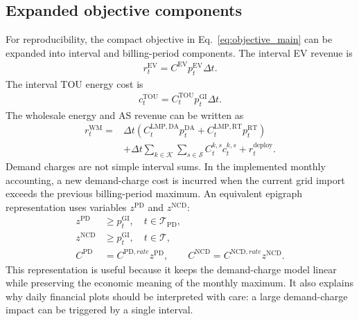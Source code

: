 \documentclass[final,5p,times]{elsarticle}
\newcommand{\DeltaT}{\Delta t}
\newcommand{\EV}{\mathrm{EV}}
\newcommand{\DA}{\mathrm{DA}}
\newcommand{\RT}{\mathrm{RT}}
\newcommand{\GI}{\mathrm{GI}}
\newcommand{\TOU}{\mathrm{TOU}}
\newcommand{\PD}{\mathrm{PD}}
\newcommand{\NCD}{\mathrm{NCD}}
\newcommand{\WM}{\mathrm{WM}}
\newcommand{\calT}{\mathcal{T}}
\newcommand{\calK}{\mathcal{K}}
\newcommand{\calS}{\mathcal{S}}
\begin{document}
\subsection{Expanded objective components}
For reproducibility, the compact objective in Eq.~\eqref{eq:objective_main} can be expanded into interval and billing-period components. The interval EV revenue is
\begin{align}
r_t^{\EV}=C^{\EV}p_t^{\EV}\DeltaT.
\label{eq:interval_ev_rev}
\end{align}
The interval TOU energy cost is
\begin{align}
c_t^{\TOU}=C_t^{\TOU}p_t^{\GI}\DeltaT.
\label{eq:interval_tou}
\end{align}
The wholesale energy and AS revenue can be written as
\begin{align}
r_t^{\WM}=&\DeltaT\left(C_t^{\mathrm{LMP},\DA}p_t^{\DA}+C_t^{\mathrm{LMP},\RT}p_t^{\RT}\right)\nonumber\\
&+\DeltaT\sum_{k\in\calK}\sum_{s\in\calS}C_t^{k,s}c_t^{k,s}+r_t^{\mathrm{deploy}}.
\label{eq:interval_wm_rev}
\end{align}
Demand charges are not simple interval sums. In the implemented monthly accounting, a new demand-charge cost is incurred when the current grid import exceeds the previous billing-period maximum. An equivalent epigraph representation uses variables $z^{\PD}$ and $z^{\NCD}$:
\begin{align}
z^{\PD}&\ge p_t^{\GI},\quad t\in\calT_{\PD},\label{eq:pd_epigraph}\\
z^{\NCD}&\ge p_t^{\GI},\quad t\in\calT,\label{eq:ncd_epigraph}\\
C^{\PD}&=C^{\PD,rate}z^{\PD},\qquad C^{\NCD}=C^{\NCD,rate}z^{\NCD}.\label{eq:dem_epigraph_cost}
\end{align}
This representation is useful because it keeps the demand-charge model linear while preserving the economic meaning of the monthly maximum. It also explains why daily financial plots should be interpreted with care: a large demand-charge impact can be triggered by a single interval.
\end{document}
